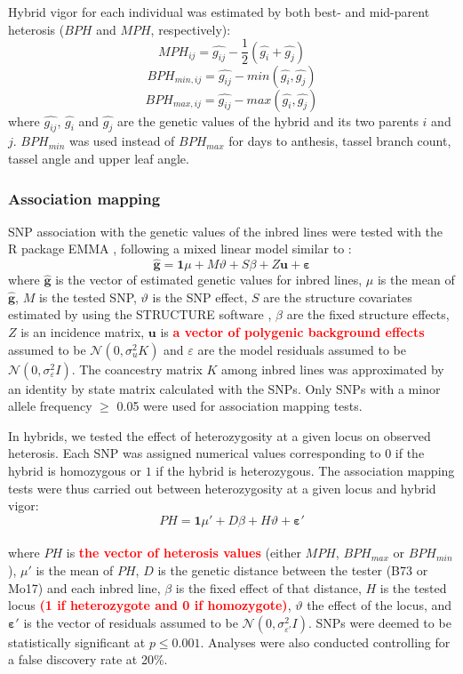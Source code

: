 \documentclass[12pt]{article}
\newcommand{\sme}[1]{\textcolor{red}{\bf #1}}
\begin{document}
Hybrid vigor for each individual was estimated by both best- and mid-parent heterosis ($BPH$ and $MPH$, respectively):
%
\[ MPH_{ij}=\hat{g_{ij}}-\frac{1}{2}(\hat{g_{i}}+\hat{g_{j}}) \]
\[ BPH_{min,ij}=\hat{g_{ij}}-min(\hat{g_{i}} ,\hat{g_{j}}) \] 
\[ BPH_{max,ij}=\hat{g_{ij}}-max(\hat{g_{i}} ,\hat{g_{j}}) \]
%
where $\hat{g_{ij}}$, $\hat{g_{i}}$ and $\hat{g_{j}}$ are the genetic values of the hybrid and its two parents $i$ and $j$. $BPH_{min}$ was used instead of $BPH_{max}$ for days to anthesis, tassel branch count, tassel angle and upper leaf angle.

\subsubsection*{Association mapping}

SNP association with the genetic values of the inbred lines were tested with the R package EMMA \citep{Kang2008}, following a mixed linear model similar to \citet{Yu2006}:
%
\[\mathbf{\hat{g}}=\mathbf{1}\mu + M\vartheta +S\beta +Z\mathbf{u}+\mathbf{\varepsilon}\]
%
where $\mathbf{\hat{g}}$ is the vector of estimated genetic values for inbred lines, $\mu$ is the mean of $\mathbf{\hat{g}}$, $M$ is the tested SNP, $\vartheta$ is the SNP effect, $S$ are the structure covariates estimated  by \citet{Flint-Garcia2005} using the STRUCTURE software \citep{Pritchard2000}, $\beta$ are the fixed structure effects, $Z$ is an incidence matrix, $\mathbf{u}$ is \sme{a vector of polygenic background effects} assumed to be $\mathcal{N}(0,\sigma_{u}^{2} K)$ and $\varepsilon$ are the model residuals assumed to be $\mathcal{N}(0,\sigma_{\varepsilon}^{2}I)$. 
The coancestry matrix $K$ among inbred lines was approximated by an identity by state matrix calculated with the SNPs. Only SNPs with a minor allele frequency $\ge$ 0.05 were used for association mapping tests.

In hybrids, we tested the effect of heterozygosity at a given locus on observed heterosis. 
Each SNP was assigned numerical values corresponding to $0$ if the hybrid is homozygous or $1$ if the hybrid is heterozygous. 
The association mapping tests were thus carried out between heterozygosity at a given locus and hybrid vigor:
%
\[PH=\mathbf{1}{\mu}'+D\beta +H\vartheta +\mathbf{{\varepsilon }'}\]  \\
%
where $PH$ is \sme{the vector of heterosis values }(either $MPH$, $BPH_{max}$ or $BPH_{min}$), ${\mu}'$ is the mean of $PH$, $D$ is the genetic distance between the tester (B73 or Mo17) and each inbred line, $\beta$ is the fixed effect of that distance, $H$ is the tested locus \sme{(1 if heterozygote and 0 if homozygote)}, $\vartheta$ the effect of the locus, and $\mathbf{{\varepsilon}'}$ is the vector of residuals assumed to be $\mathcal{N}(0,\sigma_{ {\varepsilon}'}^{2}I)$.  
SNPs were deemed to be statistically significant at $p\leq 0.001$. Analyses were also conducted controlling for a false discovery rate \citep{Benjamini1995} at 20\%.
\end{document}
